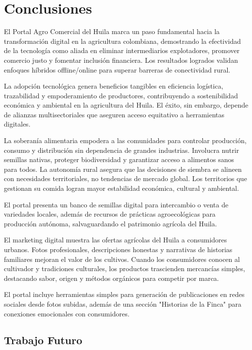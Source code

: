 \section{Conclusiones}

El Portal Agro Comercial del Huila marca un paso fundamental hacia la transformación digital en la agricultura colombiana, demostrando la efectividad de la tecnología como aliada en eliminar intermediarios explotadores, promover comercio justo y fomentar inclusión financiera. Los resultados logrados validan enfoques híbridos offline/online para superar barreras de conectividad rural.

La adopción tecnológica genera beneficios tangibles en eficiencia logística, trazabilidad y empoderamiento de productores, contribuyendo a sostenibilidad económica y ambiental en la agricultura del Huila. El éxito, sin embargo, depende de alianzas multisectoriales que aseguren acceso equitativo a herramientas digitales.

La soberanía alimentaria empodera a las comunidades para controlar producción, consumo y distribución sin dependencia de grandes industrias. Involucra nutrir semillas nativas, proteger biodiversidad y garantizar acceso a alimentos sanos para todos. La autonomía rural asegura que las decisiones de siembra se alineen con necesidades territoriales, no tendencias de mercado global. Los territorios que gestionan su comida logran mayor estabilidad económica, cultural y ambiental.

El portal presenta un banco de semillas digital para intercambio o venta de variedades locales, además de recursos de prácticas agroecológicas para producción autónoma, salvaguardando el patrimonio agrícola del Huila.

El marketing digital muestra las ofertas agrícolas del Huila a consumidores urbanos. Fotos profesionales, descripciones honestas y narrativas de historias familiares mejoran el valor de los cultivos. Cuando los consumidores conocen al cultivador y tradiciones culturales, los productos trascienden mercancías simples, destacando sabor, origen y métodos orgánicos para competir por marca.

El portal incluye herramientas simples para generación de publicaciones en redes sociales desde fotos subidas, además de una sección "Historias de la Finca" para conexiones emocionales con consumidores.

\subsection{Trabajo Futuro}

